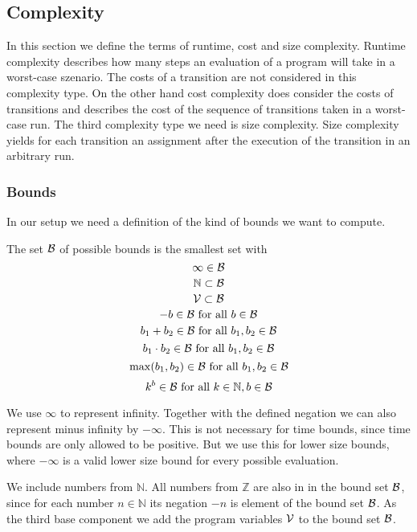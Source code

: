 \subsection{Complexity}

In this section we define the terms of runtime, cost and size complexity.
Runtime complexity describes how many steps an evaluation of a program will take in a worst-case szenario.
The costs of a transition are not considered in this complexity type.
On the other hand cost complexity does consider the costs of transitions and describes the cost of the sequence of transitions taken in a worst-case run.
The third complexity type we need is size complexity.
Size complexity yields for each transition an assignment  after the execution of the transition in an arbitrary run.

\subsubsection{Bounds}

In our setup we need a definition of the kind of bounds we want to compute.

\begin{definition}
  The set $\mathcal{B}$ of possible bounds is the smallest set with
  \[ \infty \in \mathcal{B} \]
  \[ \mathbb{N} \subset \mathcal{B} \] 
  \[ \mathcal{V} \subset \mathcal{B} \] 
  \[ -b \in \mathcal{B} \text{ for all } b \in \mathcal{B} \] 
  \[ b_1 + b_2 \in \mathcal{B} \text{ for all } b_1, b_2 \in \mathcal{B} \] 
  \[ b_1 \cdot b_2 \in \mathcal{B} \text{ for all } b_1, b_2 \in \mathcal{B} \] 
  \[ \max(b_1, b_2) \in \mathcal{B} \text{ for all } b_1, b_2 \in \mathcal{B} \]
  \[ k^b \in \mathcal{B} \text{ for all } k \in \mathbb{N}, b \in \mathcal{B} \]
\end{definition}

We use $\infty$ to represent infinity.
Together with the defined negation we can also represent minus infinity by $-\infty$.
This is not necessary for time bounds, since time bounds are only allowed to be positive.
But we use this for lower size bounds, where $-\infty$ is a valid lower size bound for every possible evaluation.

We include numbers from $\mathbb{N}$.
All numbers from $\mathbb{Z}$ are also in in the bound set $\mathcal{B}$, since for each number $n \in \mathbb{N}$ its negation $-n$ is element of the bound set $\mathcal{B}$.
As the third base component we add the program variables $\mathcal{V}$ to the bound set $\mathcal{B}$.

